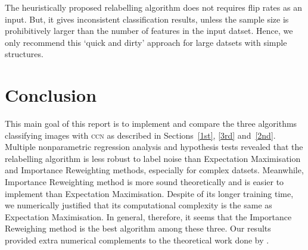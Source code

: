 \documentclass[12pt]{article} %
\newcommand{\rhoo}{\rho_{+1}}
\newcommand{\rhoz}{\rho_{-1}}
\begin{document}
The heuristically proposed relabelling algorithm does not requires flip rates as an input. But, it gives inconsistent classification results, unless the sample size is prohibitively larger than the number of features in the input datset.  Hence, we only recommend this `quick and dirty' approach for large datsets with simple structures. 














\section{Conclusion}
This main goal of this report is to implement and compare the three algorithms classifying images with \textsc{ccn} as described in Sections~\ref{1st}, \ref{3rd} and~\ref{2nd}. 
Multiple nonparametric regression analysis and hypothesis tests revealed that the relabelling algorithm is less robust to label noise than Expectation Maximisation and Importance Reweighting methods, especially for complex datsets. Meanwhile, Importance Reweighting method is more sound theoretically \citep{liu2016classification} and is easier to implement than Expectation Maximisation. 
Despite of its longer training time, we numerically justified that its computational complexity is the same as Expectation Maximisation.
In general, therefore, it seems that the Importance Reweighing method is the best algorithm among these three. 
Our results provided extra numerical complements to the theoretical work done by \citet{liu2016classification}. 
\end{document}
